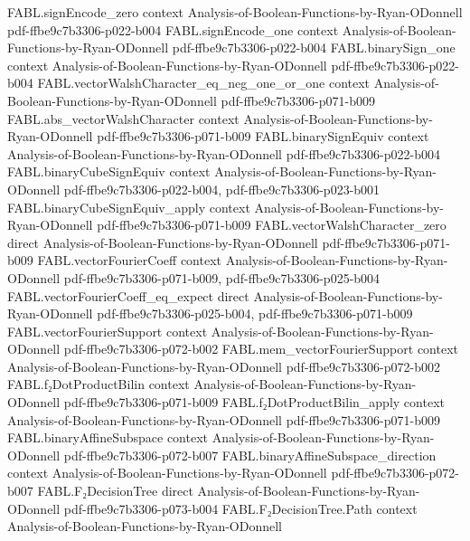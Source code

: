 \begin{theorem}
\proofstep
  {FABL.signEncode_zero}
  {context}
  {Analysis-of-Boolean-Functions-by-Ryan-ODonnell}
  {pdf-ffbe9c7b3306-p022-b004}
\proofstep
  {FABL.signEncode_one}
  {context}
  {Analysis-of-Boolean-Functions-by-Ryan-ODonnell}
  {pdf-ffbe9c7b3306-p022-b004}
\proofstep
  {FABL.binarySign_one}
  {context}
  {Analysis-of-Boolean-Functions-by-Ryan-ODonnell}
  {pdf-ffbe9c7b3306-p022-b004}
\proofstep
  {FABL.vectorWalshCharacter_eq_neg_one_or_one}
  {context}
  {Analysis-of-Boolean-Functions-by-Ryan-ODonnell}
  {pdf-ffbe9c7b3306-p071-b009}
\proofstep
  {FABL.abs_vectorWalshCharacter}
  {context}
  {Analysis-of-Boolean-Functions-by-Ryan-ODonnell}
  {pdf-ffbe9c7b3306-p071-b009}
\proofstep
  {FABL.binarySignEquiv}
  {context}
  {Analysis-of-Boolean-Functions-by-Ryan-ODonnell}
  {pdf-ffbe9c7b3306-p022-b004}
\proofstep
  {FABL.binaryCubeSignEquiv}
  {context}
  {Analysis-of-Boolean-Functions-by-Ryan-ODonnell}
  {pdf-ffbe9c7b3306-p022-b004,
    pdf-ffbe9c7b3306-p023-b001}
\proofstep
  {FABL.binaryCubeSignEquiv_apply}
  {context}
  {Analysis-of-Boolean-Functions-by-Ryan-ODonnell}
  {pdf-ffbe9c7b3306-p071-b009}
\proofstep
  {FABL.vectorWalshCharacter_zero}
  {direct}
  {Analysis-of-Boolean-Functions-by-Ryan-ODonnell}
  {pdf-ffbe9c7b3306-p071-b009}
\proofstep
  {FABL.vectorFourierCoeff}
  {context}
  {Analysis-of-Boolean-Functions-by-Ryan-ODonnell}
  {pdf-ffbe9c7b3306-p071-b009,
    pdf-ffbe9c7b3306-p025-b004}
\proofstep
  {FABL.vectorFourierCoeff_eq_expect}
  {direct}
  {Analysis-of-Boolean-Functions-by-Ryan-ODonnell}
  {pdf-ffbe9c7b3306-p025-b004,
    pdf-ffbe9c7b3306-p071-b009}
\proofstep
  {FABL.vectorFourierSupport}
  {context}
  {Analysis-of-Boolean-Functions-by-Ryan-ODonnell}
  {pdf-ffbe9c7b3306-p072-b002}
\proofstep
  {FABL.mem_vectorFourierSupport}
  {context}
  {Analysis-of-Boolean-Functions-by-Ryan-ODonnell}
  {pdf-ffbe9c7b3306-p072-b002}
\proofstep
  {FABL.f₂DotProductBilin}
  {context}
  {Analysis-of-Boolean-Functions-by-Ryan-ODonnell}
  {pdf-ffbe9c7b3306-p071-b009}
\proofstep
  {FABL.f₂DotProductBilin_apply}
  {context}
  {Analysis-of-Boolean-Functions-by-Ryan-ODonnell}
  {pdf-ffbe9c7b3306-p071-b009}
\proofstep
  {FABL.binaryAffineSubspace}
  {context}
  {Analysis-of-Boolean-Functions-by-Ryan-ODonnell}
  {pdf-ffbe9c7b3306-p072-b007}
\proofstep
  {FABL.binaryAffineSubspace_direction}
  {context}
  {Analysis-of-Boolean-Functions-by-Ryan-ODonnell}
  {pdf-ffbe9c7b3306-p072-b007}
\proofstep
  {FABL.F₂DecisionTree}
  {direct}
  {Analysis-of-Boolean-Functions-by-Ryan-ODonnell}
  {pdf-ffbe9c7b3306-p073-b004}
\proofstep
  {FABL.F₂DecisionTree.Path}
  {context}
  {Analysis-of-Boolean-Functions-by-Ryan-ODonnell}

\end{theorem}
